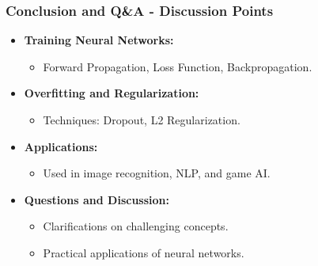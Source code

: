 \documentclass[aspectratio=169]{beamer}
\begin{document}
\begin{frame}[fragile]
    \frametitle{Conclusion and Q\&A - Discussion Points}
    
    \begin{itemize}
        \item \textbf{Training Neural Networks:}
            \begin{itemize}
                \item Forward Propagation, Loss Function, Backpropagation.
            \end{itemize}
        
        \item \textbf{Overfitting and Regularization:}
            \begin{itemize}
                \item Techniques: Dropout, L2 Regularization.
            \end{itemize}
        
        \item \textbf{Applications:}
            \begin{itemize}
                \item Used in image recognition, NLP, and game AI.
            \end{itemize}
            
        \item \textbf{Questions and Discussion:}
            \begin{itemize}
                \item Clarifications on challenging concepts.
                \item Practical applications of neural networks.
            \end{itemize}
    \end{itemize}
\end{frame}
\end{document}
